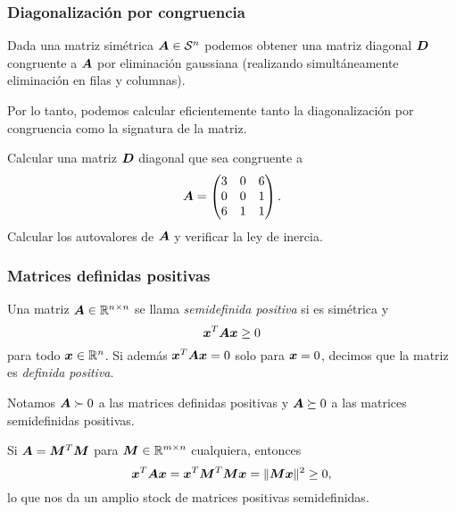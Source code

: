 \documentclass[aspectratio=169,12pt,spanish]{beamer}
\begin{document}

\begin{frame}
\frametitle{Diagonalización por congruencia}

Dada una matriz simétrica $\bm{A} \in {\mathcal S^n}$ podemos obtener una matriz diagonal $\bm{D}$ congruente a $\bm{A}$ por eliminación gaussiana (realizando simultáneamente eliminación en filas y columnas). 

Por lo tanto, podemos calcular eficientemente tanto la diagonalización por congruencia como la signatura de la matriz.

\begin{example}
Calcular una matriz $\bm{D}$ diagonal que sea congruente a 
$$
\bm{A} = 
\begin{pmatrix}
3 & 0 & 6 \\
0 & 0 & 1 \\
6 & 1 & 1 
\end{pmatrix}.
$$
Calcular los autovalores de $\bm{A}$ y verificar la ley de inercia.
\end{example}

\end{frame}


\begin{frame}
\frametitle{Matrices definidas positivas}

Una matriz $\bm{A} \in \mathbb{R}^{n \times n}$ se llama \emph{semidefinida positiva} si es simétrica y
$$
\bm{x}^T \bm{A} \bm{x}  \ge 0
$$
para todo $\bm{x} \in \mathbb{R}^n$. Si además $\bm{x}^T \bm{A} \bm{x} = 0$ solo para $\bm{x} = 0$, decimos que la matriz es \emph{definida positiva}.

Notamos $\bm{A} \succ 0$ a las matrices definidas positivas y $\bm{A} \succeq 0$ a las matrices semidefinidas positivas.

Si $\bm{A} = \bm{M}^T \bm{M}$ para $\bm{M} \in \mathbb{R}^{m \times n}$ cualquiera, entonces
$$
\bm{x}^T \bm{A} \bm{x} = \bm{x}^T \bm{M}^T \bm{M} \bm{x} = \| \bm{M} \bm{x} \|^2 \ge 0,
$$
lo que nos da un amplio stock de matrices positivas semidefinidas.

\end{frame}

\end{document}
